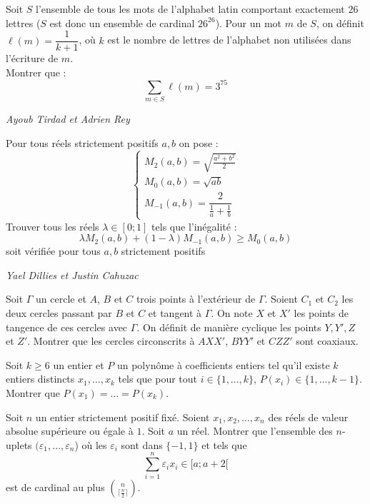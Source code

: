 \begin{exo}{}
Soit $S$ l'ensemble de tous les mots de l'alphabet latin comportant exactement $26$ lettres ($S$ est donc un ensemble de cardinal $26^{26}$). Pour un mot $m$ de $S$, on définit $\ell(m) = \dfrac{1}{k+1}$, où $k$ est le nombre de lettres de l'alphabet non utilisées dans l'écriture de $m$. \\
Montrer que :
\[ \displaystyle \sum_{m \in S} \ell(m) = 3^{75} \]

\medskip
\textit{Ayoub Tirdad et Adrien Rey}
\end{exo}

\begin{exo}{}
Pour tous réels strictement positifs $a,b$ on pose :
$$\begin{cases} M_2(a,b)=\sqrt{\frac{a^2+b^2}{2}}\\M_0(a,b)=\sqrt{ab}\\M_{-1}(a,b)=\dfrac{2}{\frac{1}{a}+\frac{1}{b}}\end{cases}$$
Trouver tous les réels $\lambda\in [0;1]$ tels que l'inégalité :
$$\lambda M_2(a,b)+(1-\lambda)M_{-1}(a,b)\ge M_0(a,b)$$
soit vérifiée pour tous $a,b$ strictement positifs

\medskip
\textit{Yael Dillies et Justin Cahuzac}
\end{exo}




\begin{exo}{}
Soit $\Gamma$ un cercle et $A$, $B$ et $C$ trois points à l'extérieur de $\Gamma$. Soient $C_1$ et $C_2$ les deux cercles passant par $B$ et $C$ et tangent à $\Gamma$. On note $X$ et $X'$ les points de tangence de ces cercles avec $\Gamma$. On définit de manière cyclique les points $Y,Y',Z$ et $Z'$. Montrer que les cercles circonscrits à $AXX'$, $BYY'$ et $CZZ'$ sont coaxiaux.
\end{exo}




\begin{exo}{} Soit $k\geq 6$ un entier et $P$ un polynôme à coefficients entiers tel qu'il existe $k$ entiers distincts $x_1,\ldots,x_k$ tels que pour tout $i\in \{1,\ldots,k\}$, $P(x_i) \in \{1,\ldots,k-1\}$. Montrer que $P(x_1) = \ldots = P(x_k)$.
\end{exo}

\begin{exo}{}
Soit $n$ un entier strictement positif fixé. Soient $x_1, x_2,\dots, x_n$ des réels de valeur
absolue supérieure ou égale à $1$. Soit $a$ un réel. Montrer que l’ensemble des $n$-uplets $(\varepsilon_1,\dots,\varepsilon_n$)
où les $\varepsilon_i$ sont dans $\{-1,1\}$ et tels que
$$\sum\limits_{i=1}^n \varepsilon_i x_i \in [a;a+2[$$
est de cardinal au plus $\binom{n}{\lceil \frac{n}{2}\rceil}$.
\end{exo}

